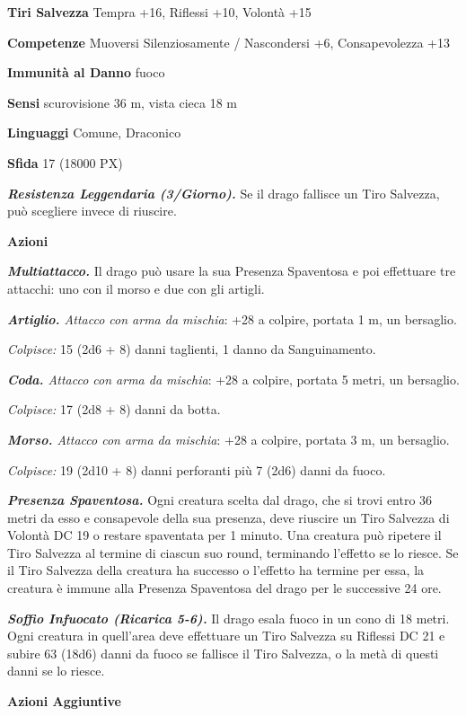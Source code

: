 \begin{multicols}{2}
\textbf{Tiri Salvezza} Tempra +16, Riflessi +10, Volontà +15

\textbf{Competenze} Muoversi Silenziosamente / Nascondersi +6, Consapevolezza +13

\textbf{Immunità al Danno} fuoco

\textbf{Sensi} scurovisione 36 m, vista cieca 18 m

\textbf{Linguaggi} Comune, Draconico

\textbf{Sfida} 17 (18000 PX)

\textit{\textbf{Resistenza Leggendaria (3/Giorno).}} Se il drago fallisce un Tiro Salvezza, può scegliere invece di riuscire.

\textbf{Azioni}

\textit{\textbf{Multiattacco.}} Il drago può usare la sua Presenza Spaventosa e poi effettuare tre attacchi: uno con il morso e due con gli artigli.

\textit{\textbf{Artiglio.} Attacco con arma da mischia}: +28 a colpire, portata 1 m, un bersaglio.

\textit{Colpisce:} 15 (2d6 + 8) danni taglienti, 1 danno da Sanguinamento.

\textit{\textbf{Coda.} Attacco con arma da mischia}: +28 a colpire, portata 5 metri, un bersaglio.

\textit{Colpisce:} 17 (2d8 + 8) danni da botta.

\textit{\textbf{Morso.} Attacco con arma da mischia}: +28 a colpire, portata 3 m, un bersaglio.

\textit{Colpisce:} 19 (2d10 + 8) danni perforanti più 7 (2d6) danni da
fuoco.

\textit{\textbf{Presenza Spaventosa.}} Ogni creatura scelta dal drago, che si trovi entro 36 metri da esso e consapevole della sua presenza, deve riuscire un Tiro Salvezza di Volontà DC 19 o restare spaventata per 1 minuto. Una creatura può ripetere il Tiro Salvezza al termine di ciascun suo round, terminando l'effetto se lo riesce. Se il Tiro Salvezza della creatura ha successo o l'effetto ha termine per essa, la creatura è immune alla Presenza Spaventosa del drago per le successive 24 ore.

\textit{\textbf{Soffio Infuocato (Ricarica 5-6).}} Il drago esala fuoco in un cono di 18 metri. Ogni creatura in quell'area deve effettuare un Tiro Salvezza su Riflessi DC 21 e subire 63 (18d6) danni da fuoco se fallisce il Tiro Salvezza, o la metà di questi danni se lo riesce.

\textbf{Azioni Aggiuntive}


\end{multicols}
